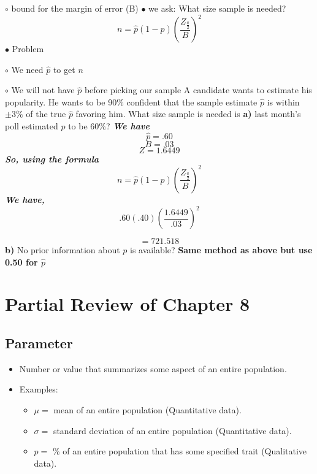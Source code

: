 \documentclass{report}
\begin{document}
$\circ$ {bound for the margin of error (B)}
\bigbreak \noindent
$\bullet$ we ask: What size sample is needed?
$$ n = \hat{p}(1-\hat{p}) \left(\frac{Z_{\frac{a}{2}}}{B}\right)^2$$
\bigbreak\noindent
$\bullet$ Problem
\vspace{1mm}

$\circ$ We need $\hat{p}$ to get $n$
\vspace{1mm}

$\circ$ We will not have $\hat{p}$ before picking our sample
\bigbreak \noindent
{}
\q
A candidate wants to estimate his popularity. He wants to be 90\% confident that the sample estimate $\hat{p}$ is within $\pm{3\%}$ of the true $\hat{p}$ favoring him. What size sample is needed is
\bigbreak \noindent
\textbf{a)} last month's poll estimated $p$ to be 60\%?
\bigbreak \noindent
\textit{\textbf{We have}}
$$ \hat{p} = .60$$
$$ B = .03$$
$$ Z = 1.6449$$
\textit{\textbf{So, using the formula}}
$$ n = \hat{p}(1-\hat{p}) \left(\frac{Z_{\frac{a}{2}}}{B}\right)^2$$
\textit{\textbf{We have,}}
$$ .60(.40) \left(\frac{1.6449}{.03}\right)^2$$

$$ = 721.518$$
\bigbreak \noindent
\textbf{b)} No prior information about $p$ is available?
\bigbreak \noindent
\textbf{Same method as above but use 0.50 for $\hat{p}$}

\pagebreak
\section*{Partial Review of Chapter 8}
\subsection*{Parameter}
\begin{itemize}
    \item Number or value that summarizes some aspect of an entire population.
    \item Examples:
    \begin{itemize}
        \item $\mu = $ mean of an entire population (Quantitative data).
        \item $\sigma = $ standard deviation of an entire population (Quantitative data).
        \item $p = $ \% of an entire population that has some specified trait (Qualitative data).
    \end{itemize}
\end{itemize}
\end{document}
